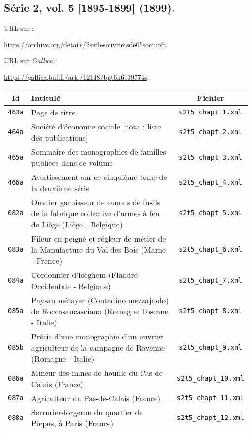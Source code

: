 \subsection{Série 2, vol. 5 [1895-1899] (1899).}
\label{mappings2t5}

URL sur \ia{} : 

\url{https://archive.org/details/2serlesouvriersde05sociuoft}.

URL sur \textit{Gallica} : 

\url{https://gallica.bnf.fr/ark:/12148/bpt6k6139774s}.

\begin{center}
\begin{longtable}{ | c | p{9.5cm} | c | }
\hline
Id & Intitulé & Fichier \\ \hline
\texttt{463a} & Page de titre & \texttt{s2t5\_chapt\_1.xml} \\ \hline
\texttt{464a} & Société d'économie sociale [nota : liste des publications] & \texttt{s2t5\_chapt\_2.xml} \\ \hline
\texttt{465a} & Sommaire des monographies de familles publiées dans ce volume & \texttt{s2t5\_chapt\_3.xml} \\ \hline
\texttt{466a} & Avertissement sur ce cinquième tome de la deuxième série & \texttt{s2t5\_chapt\_4.xml} \\ \hline
\texttt{082a} & Ouvrier garnisseur de canons de fusils de la fabrique collective d'armes à feu de Liège (Liège - Belgique) & \texttt{s2t5\_chapt\_5.xml} \\ \hline
\texttt{083a} & Fileur en peigné et régleur de métier de la Manufacture du Val-des-Bois (Marne - France) & \texttt{s2t5\_chapt\_6.xml} \\ \hline
\texttt{084a} & Cordonnier d'Iseghem (Flandre Occidentale - Belgique) & \texttt{s2t5\_chapt\_7.xml} \\ \hline
\texttt{085a} & Paysan métayer (Contadino mezzajuolo) de Roccasancasciano (Romagne Toscane - Italie) & \texttt{s2t5\_chapt\_8.xml} \\ \hline
\texttt{085b} & Précis d'une monographie d'un ouvrier agriculteur de la campagne de Ravenne (Romagne - Italie) & \texttt{s2t5\_chapt\_9.xml} \\ \hline
\texttt{086a} & Mineur des mines de houille du Pas-de-Calais (France) & \texttt{s2t5\_chapt\_10.xml} \\ \hline
\texttt{087a} & Agriculteur du Pas-de-Calais (France) & \texttt{s2t5\_chapt\_11.xml} \\ \hline
\texttt{088a} & Serrurier-forgeron du quartier de Picpus, à Paris (France) & \texttt{s2t5\_chapt\_12.xml} \\ \hline

\end{longtable}
\end{center}
